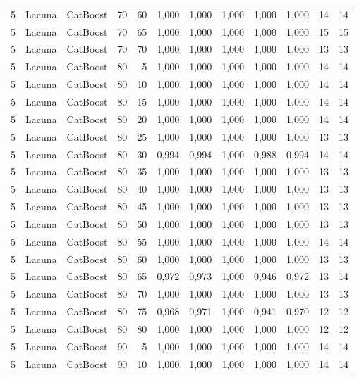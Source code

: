 \begin{longtable}{@{}rllrrrrrrrrr@{}}
5 & Lacuna & CatBoost & 70 & 60 & 1,000 & 1,000 & 1,000 & 1,000 & 1,000 & 14 & 14 \\
5 & Lacuna & CatBoost & 70 & 65 & 1,000 & 1,000 & 1,000 & 1,000 & 1,000 & 15 & 15 \\
5 & Lacuna & CatBoost & 70 & 70 & 1,000 & 1,000 & 1,000 & 1,000 & 1,000 & 13 & 13 \\
5 & Lacuna & CatBoost & 80 & 5 & 1,000 & 1,000 & 1,000 & 1,000 & 1,000 & 14 & 14 \\
5 & Lacuna & CatBoost & 80 & 10 & 1,000 & 1,000 & 1,000 & 1,000 & 1,000 & 14 & 14 \\
5 & Lacuna & CatBoost & 80 & 15 & 1,000 & 1,000 & 1,000 & 1,000 & 1,000 & 14 & 14 \\
5 & Lacuna & CatBoost & 80 & 20 & 1,000 & 1,000 & 1,000 & 1,000 & 1,000 & 14 & 14 \\
5 & Lacuna & CatBoost & 80 & 25 & 1,000 & 1,000 & 1,000 & 1,000 & 1,000 & 13 & 13 \\
5 & Lacuna & CatBoost & 80 & 30 & 0,994 & 0,994 & 1,000 & 0,988 & 0,994 & 14 & 14 \\
5 & Lacuna & CatBoost & 80 & 35 & 1,000 & 1,000 & 1,000 & 1,000 & 1,000 & 13 & 13 \\
5 & Lacuna & CatBoost & 80 & 40 & 1,000 & 1,000 & 1,000 & 1,000 & 1,000 & 13 & 13 \\
5 & Lacuna & CatBoost & 80 & 45 & 1,000 & 1,000 & 1,000 & 1,000 & 1,000 & 13 & 13 \\
5 & Lacuna & CatBoost & 80 & 50 & 1,000 & 1,000 & 1,000 & 1,000 & 1,000 & 13 & 13 \\
5 & Lacuna & CatBoost & 80 & 55 & 1,000 & 1,000 & 1,000 & 1,000 & 1,000 & 14 & 14 \\
5 & Lacuna & CatBoost & 80 & 60 & 1,000 & 1,000 & 1,000 & 1,000 & 1,000 & 13 & 13 \\
5 & Lacuna & CatBoost & 80 & 65 & 0,972 & 0,973 & 1,000 & 0,946 & 0,972 & 13 & 14 \\
5 & Lacuna & CatBoost & 80 & 70 & 1,000 & 1,000 & 1,000 & 1,000 & 1,000 & 13 & 13 \\
5 & Lacuna & CatBoost & 80 & 75 & 0,968 & 0,971 & 1,000 & 0,941 & 0,970 & 12 & 12 \\
5 & Lacuna & CatBoost & 80 & 80 & 1,000 & 1,000 & 1,000 & 1,000 & 1,000 & 12 & 12 \\
5 & Lacuna & CatBoost & 90 & 5 & 1,000 & 1,000 & 1,000 & 1,000 & 1,000 & 14 & 14 \\
5 & Lacuna & CatBoost & 90 & 10 & 1,000 & 1,000 & 1,000 & 1,000 & 1,000 & 14 & 14 \\

\end{longtable}
